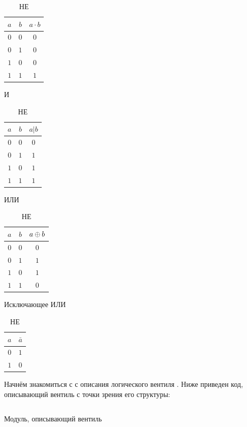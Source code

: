 \begin{table}[!htbp]
  \parbox{.45\linewidth}{
    \centering
  \begin{tabular}{c|c|c}
    $a$&$b$&$a \cdot b$\\
    \hline
    $0$ & $0$ & $0$ \\
    $0$ & $1$ & $0$ \\
    $1$ & $0$ & $0$ \\
    $1$ & $1$ & $1$ \\
  \end{tabular}
  \caption{И}
} \hfill
  \parbox{.45\linewidth}{
    \centering
  \begin{tabular}{c|c|c}

    $a$&$b$&$a | b$\\
    \hline
    $0$ & $0$ & $0$ \\
    $0$ & $1$ & $1$ \\
    $1$ & $0$ & $1$ \\
    $1$ & $1$ & $1$ \\

  \end{tabular}
  \caption{ИЛИ}
}\hfill
  \parbox{.45\linewidth}{
    \centering
  \begin{tabular}{c|c|c}
    $a$&$b$&$a \mathbin{\oplus} b$\\
    \hline
    $0$ & $0$ & $0$ \\
    $0$ & $1$ & $1$ \\
    $1$ & $0$ & $1$ \\
    $1$ & $1$ & $0$ \\
  \end{tabular}
  \caption{Исключающее ИЛИ}
}\hfill
  \parbox{.45\linewidth}{
    \centering
  \begin{tabular}{c|c}
    $a$&$\bar{a}$\\
    \hline
    $0$ & $1$\\
    $1$ & $0$\\
  \end{tabular}
  \caption{НЕ}
}
\end{table}

\par{Начнём знакомиться с  с описания логического вентиля . Ниже приведен код, описывающий вентиль с точки зрения его структуры:}

\begin{listing}[H]
	\inputminted{SystemVerilog}{code_examples/lab_1/and_gate.sv}
	\caption{Модуль, описывающий вентиль }
\end{listing}



